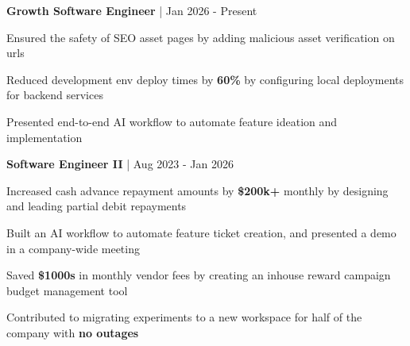 


\begin{cventries}

\cventry
{\textbf{Growth Software Engineer} | \color{awesome}{Coinbase}}
{Jan 2026 - Present} %
{ %
\begin{cvitems}
\item {Ensured the safety of SEO asset pages by adding malicious asset verification on urls}
\item {Reduced development env deploy times by \textbf{60\%} by configuring local deployments for backend services}
\item {Presented end-to-end AI workflow to automate feature ideation and implementation}
\end{cvitems}
}


\cventry
{\textbf{Software Engineer II} | \color{awesome}{Super.com}}
{Aug 2023 - Jan 2026} %
{ %
\begin{cvitems}
\item {Increased cash advance repayment amounts by \textbf{\$200k+} monthly by designing and leading partial debit repayments}
\item {Built an AI workflow to automate feature ticket creation, and presented a demo in a company-wide meeting}
\item {Saved \textbf{\$1000s} in monthly vendor fees by creating an inhouse reward campaign budget management tool}
\item {Contributed to migrating experiments to a new workspace for half of the company with \textbf{no outages}}
\end{cvitems}
}


\end{cventries}
